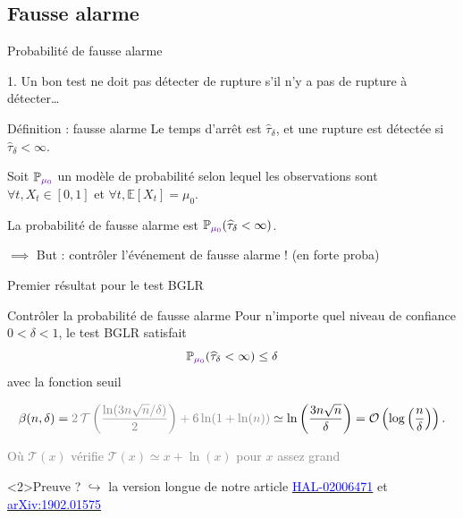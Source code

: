 \documentclass[11pt,french,ignorenonframetext,]{beamer}
\begin{document}
\subsection{\hfill{}Fausse alarme\hfill{}}

\begin{frame}{Probabilité de fausse alarme}

  1. Un bon test ne doit pas détecter de rupture s'il n'y a pas de rupture à détecter\ldots

  \pause
  \begin{block}{Définition : fausse alarme}
    Le temps d'arrêt est $\widehat{\tau}_\delta$,
    et une rupture est détectée si $\widehat{\tau}_\delta < \infty$.

    Soit $\mathbb{P}_{\textcolor{deeppurple}{\mu_0}}$ un modèle de probabilité selon lequel les observations sont $\forall t, X_t \in[0,1]$
    et \textcolor{deeppurple}{$\forall t, \mathbb{E}[X_t] = \mu_0$}.

    La \alert{probabilité de fausse alarme} est $\mathbb{P}_{\textcolor{deeppurple}{\mu_0}}(\widehat{\tau}_\delta < \infty)$.
  \end{block}

  \alert{$\implies$ But : contrôler l'événement de fausse alarme !} (en forte proba)

\end{frame}

\begin{frame}{Premier résultat pour le test BGLR \dSmiley{}}

  \begin{block}{Contrôler la probabilité de fausse alarme}
    Pour n'importe quel \alert{niveau de confiance} $0<\delta<1$,
    le test BGLR satisfait
    \[ \mathbb{P}_{\textcolor{deeppurple}{\mu_0}}(\widehat{\tau}_\delta < \infty) \leq \delta \]
    avec la fonction seuil
    \begin{small}
      \[ \beta(n,\delta) = \textcolor{gray}{2\,\mathcal{T}\left(\frac{\ln(3n\sqrt{n}/\delta)}{2}\right) + 6\ln(1+\ln(n))} \simeq \ln\left(\frac{3n \sqrt{n}}{\delta}\right) = \mathcal{O}\left(\log\left(\frac{n}{\delta}\right)\right).\]
    \end{small}
    \begin{footnotesize}
      \textcolor{gray}{Où $\mathcal{T}(x)$ vérifie $\mathcal{T}(x)\simeq x + \ln(x)$ pour $x$ assez grand}
    \end{footnotesize}
  \end{block}

  \begin{small}
    \begin{exampleblock}<2>{Preuve ?}
      $\hookrightarrow$ la version longue de notre article
      \href{https://hal.inria.fr/hal-02006471}{\textcolor{blue}{HAL-02006471}}
      et
      \href{https://arxiv.org/abs/1902.01575}{\textcolor{blue}{arXiv:1902.01575}}
    \end{exampleblock}
  \end{small}

\end{frame}
\end{document}
